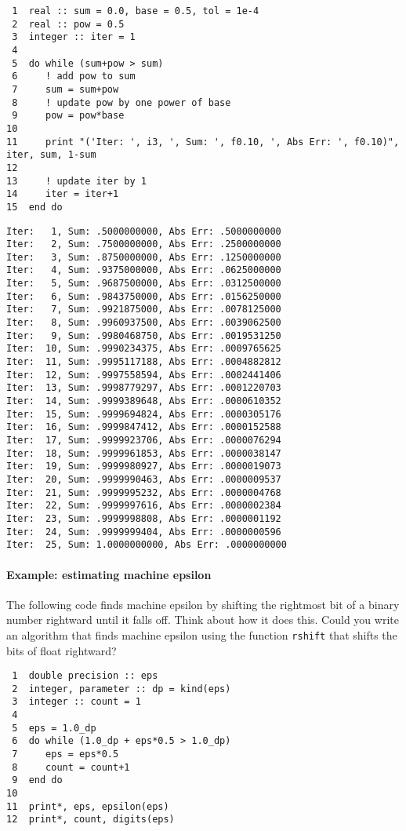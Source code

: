 \documentclass[11pt]{article}
\begin{document}
\begin{verbatim}
 1  real :: sum = 0.0, base = 0.5, tol = 1e-4
 2  real :: pow = 0.5
 3  integer :: iter = 1
 4  
 5  do while (sum+pow > sum)
 6     ! add pow to sum
 7     sum = sum+pow
 8     ! update pow by one power of base
 9     pow = pow*base
10  
11     print "('Iter: ', i3, ', Sum: ', f0.10, ', Abs Err: ', f0.10)", iter, sum, 1-sum
12  
13     ! update iter by 1
14     iter = iter+1
15  end do
\end{verbatim}

\begin{verbatim}
Iter:   1, Sum: .5000000000, Abs Err: .5000000000
Iter:   2, Sum: .7500000000, Abs Err: .2500000000
Iter:   3, Sum: .8750000000, Abs Err: .1250000000
Iter:   4, Sum: .9375000000, Abs Err: .0625000000
Iter:   5, Sum: .9687500000, Abs Err: .0312500000
Iter:   6, Sum: .9843750000, Abs Err: .0156250000
Iter:   7, Sum: .9921875000, Abs Err: .0078125000
Iter:   8, Sum: .9960937500, Abs Err: .0039062500
Iter:   9, Sum: .9980468750, Abs Err: .0019531250
Iter:  10, Sum: .9990234375, Abs Err: .0009765625
Iter:  11, Sum: .9995117188, Abs Err: .0004882812
Iter:  12, Sum: .9997558594, Abs Err: .0002441406
Iter:  13, Sum: .9998779297, Abs Err: .0001220703
Iter:  14, Sum: .9999389648, Abs Err: .0000610352
Iter:  15, Sum: .9999694824, Abs Err: .0000305176
Iter:  16, Sum: .9999847412, Abs Err: .0000152588
Iter:  17, Sum: .9999923706, Abs Err: .0000076294
Iter:  18, Sum: .9999961853, Abs Err: .0000038147
Iter:  19, Sum: .9999980927, Abs Err: .0000019073
Iter:  20, Sum: .9999990463, Abs Err: .0000009537
Iter:  21, Sum: .9999995232, Abs Err: .0000004768
Iter:  22, Sum: .9999997616, Abs Err: .0000002384
Iter:  23, Sum: .9999998808, Abs Err: .0000001192
Iter:  24, Sum: .9999999404, Abs Err: .0000000596
Iter:  25, Sum: 1.0000000000, Abs Err: .0000000000
\end{verbatim}

\paragraph{Example: estimating machine epsilon}
\label{sec:orgheadline31}
The following code finds machine epsilon by shifting the rightmost bit of a binary number rightward until it falls off. Think about how it does this. Could you write an algorithm that finds machine epsilon using the function \texttt{rshift} that shifts the bits of float rightward?

\begin{verbatim}
 1  double precision :: eps
 2  integer, parameter :: dp = kind(eps)
 3  integer :: count = 1
 4  
 5  eps = 1.0_dp
 6  do while (1.0_dp + eps*0.5 > 1.0_dp)
 7     eps = eps*0.5
 8     count = count+1
 9  end do
10  
11  print*, eps, epsilon(eps)
12  print*, count, digits(eps)
\end{verbatim}
\end{document}
